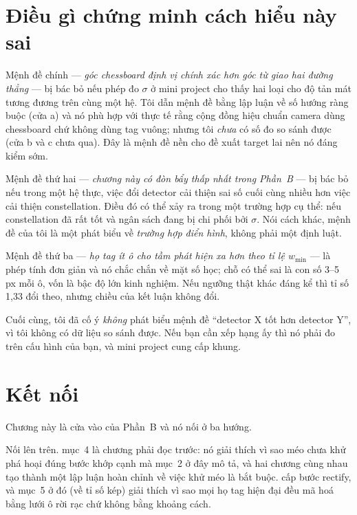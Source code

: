 \documentclass[../../marker.tex]{subfiles}
\begin{document}
\section{Điều gì chứng minh cách hiểu này sai}

Mệnh đề chính --- \emph{góc chessboard định vị chính xác hơn góc từ giao hai đường thẳng} --- bị bác bỏ nếu phép đo \(\sigma\) ở mini project cho thấy hai loại cho độ tản mát tương đương trên cùng một hệ. Tôi dẫn mệnh đề bằng lập luận về số hướng ràng buộc (cửa a) và nó phù hợp với thực tế rằng cộng đồng hiệu chuẩn camera dùng chessboard chứ không dùng tag vuông; nhưng tôi \emph{chưa} có số đo so sánh được (cửa b và c chưa qua). Đây là mệnh đề nền cho đề xuất target lai nên nó đáng kiểm sớm.

Mệnh đề thứ hai --- \emph{chương này có đòn bẩy thấp nhất trong Phần~B} --- bị bác bỏ nếu trong một hệ thực, việc đổi detector cải thiện sai số cuối cùng nhiều hơn việc cải thiện constellation. Điều đó có thể xảy ra trong một trường hợp cụ thể: nếu constellation đã rất tốt và ngân sách đang bị chi phối bởi \(\sigma\). Nói cách khác, mệnh đề của tôi là một phát biểu về \emph{trường hợp điển hình}, không phải một định luật.

Mệnh đề thứ ba --- \emph{họ tag ít ô cho tầm phát hiện xa hơn theo tỉ lệ \(w_{\min}\)} --- là phép tính đơn giản và nó chắc chắn về mặt số học; chỗ có thể sai là con số 3--5 px mỗi ô, vốn là bậc độ lớn kinh nghiệm. Nếu ngưỡng thật khác đáng kể thì tỉ số 1,33 đổi theo, nhưng chiều của kết luận không đổi.

Cuối cùng, tôi đã cố ý \emph{không} phát biểu mệnh đề ``detector X tốt hơn detector Y'', vì tôi không có dữ liệu so sánh được. Nếu bạn cần xếp hạng ấy thì nó phải đo trên cấu hình của bạn, và mini project cung cấp khung.

\section{Kết nối}

Chương này là cửa vào của Phần~B và nó nối ở ba hướng.

Nối lên trên.  mục~4 là chương phải đọc trước: nó giải thích vì sao méo chưa khử phá hoại đúng bước khớp cạnh mà mục~2 ở đây mô tả, và hai chương cùng nhau tạo thành một lập luận hoàn chỉnh về việc khử méo là bắt buộc.  cấp bước rectify, và mục~5 ở đó (về tỉ số kép) giải thích vì sao mọi họ tag hiện đại đều mã hoá bằng lưới ô rời rạc chứ không bằng khoảng cách.
\end{document}
